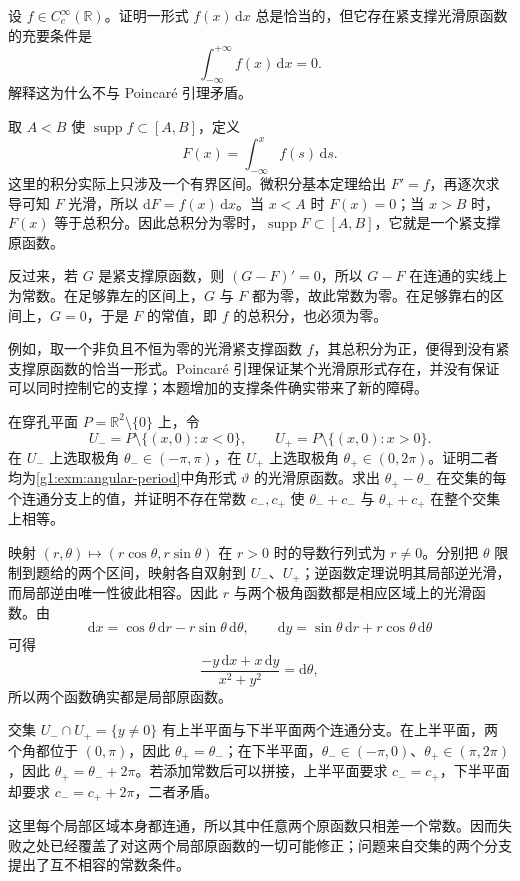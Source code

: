 \begin{exercise}\label{g1:ex:compactly-supported-primitive-line}
	设 \(f\in C^\infty_c(\mathbb R)\)。证明一形式 \(f(x)\,\mathrm{d}x\) 总是恰当的，但它存在紧支撑光滑原函数的充要条件是
	\[
		\int_{-\infty}^{+\infty}f(x)\,\mathrm{d}x=0.
	\]
	解释这为什么不与 Poincaré 引理矛盾。
\end{exercise}
\begin{solution}
	取 \(A<B\) 使 \(\operatorname{supp}f\subset[A,B]\)，定义
	\[
		F(x)=\int_{-\infty}^x f(s)\,\mathrm{d}s.
	\]
	这里的积分实际上只涉及一个有界区间。微积分基本定理给出 \(F'=f\)，再逐次求导可知 \(F\) 光滑，所以 \(\mathrm{d}F=f(x)\,\mathrm{d}x\)。当 \(x<A\) 时 \(F(x)=0\)；当 \(x>B\) 时，\(F(x)\) 等于总积分。因此总积分为零时，\(\operatorname{supp}F\subset[A,B]\)，它就是一个紧支撑原函数。

	反过来，若 \(G\) 是紧支撑原函数，则 \((G-F)'=0\)，所以 \(G-F\) 在连通的实线上为常数。在足够靠左的区间上，\(G\) 与 \(F\) 都为零，故此常数为零。在足够靠右的区间上，\(G=0\)，于是 \(F\) 的常值，即 \(f\) 的总积分，也必须为零。

	例如，取一个非负且不恒为零的光滑紧支撑函数 \(f\)，其总积分为正，便得到没有紧支撑原函数的恰当一形式。Poincaré 引理保证某个光滑原形式存在，并没有保证可以同时控制它的支撑；本题增加的支撑条件确实带来了新的障碍。
\end{solution}

\begin{exercise}\label{g1:ex:angle-branches-gluing}
	在穿孔平面 \(P=\mathbb R^2\setminus\{0\}\) 上，令
	\[
		U_-=P\setminus\{(x,0):x<0\},\qquad
		U_+=P\setminus\{(x,0):x>0\}.
	\]
	在 \(U_-\) 上选取极角 \(\theta_-\in(-\pi,\pi)\)，在 \(U_+\) 上选取极角 \(\theta_+\in(0,2\pi)\)。证明二者均为\cref{g1:exm:angular-period}中角形式 \(\vartheta\) 的光滑原函数。求出 \(\theta_+-\theta_-\) 在交集的每个连通分支上的值，并证明不存在常数 \(c_-,c_+\) 使 \(\theta_-+c_-\) 与 \(\theta_++c_+\) 在整个交集上相等。
\end{exercise}
\begin{solution}
	映射 \((r,\theta)\mapsto(r\cos\theta,r\sin\theta)\) 在 \(r>0\) 时的导数行列式为 \(r\ne0\)。分别把 \(\theta\) 限制到题给的两个区间，映射各自双射到 \(U_-\)、\(U_+\)；逆函数定理说明其局部逆光滑，而局部逆由唯一性彼此相容。因此 \(r\) 与两个极角函数都是相应区域上的光滑函数。由
	\[
		\mathrm{d}x=\cos\theta\,\mathrm{d}r-r\sin\theta\,\mathrm{d}\theta,\qquad
		\mathrm{d}y=\sin\theta\,\mathrm{d}r+r\cos\theta\,\mathrm{d}\theta
	\]
	可得
	\[
		\frac{-y\,\mathrm{d}x+x\,\mathrm{d}y}{x^2+y^2}=\mathrm{d}\theta,
	\]
	所以两个函数确实都是局部原函数。

	交集 \(U_-\cap U_+=\{y\ne0\}\) 有上半平面与下半平面两个连通分支。在上半平面，两个角都位于 \((0,\pi)\)，因此 \(\theta_+=\theta_-\)；在下半平面，\(\theta_-\in(-\pi,0)\)、\(\theta_+\in(\pi,2\pi)\)，因此 \(\theta_+=\theta_-+2\pi\)。若添加常数后可以拼接，上半平面要求 \(c_-=c_+\)，下半平面却要求 \(c_-=c_++2\pi\)，二者矛盾。

	这里每个局部区域本身都连通，所以其中任意两个原函数只相差一个常数。因而失败之处已经覆盖了对这两个局部原函数的一切可能修正；问题来自交集的两个分支提出了互不相容的常数条件。
\end{solution}

